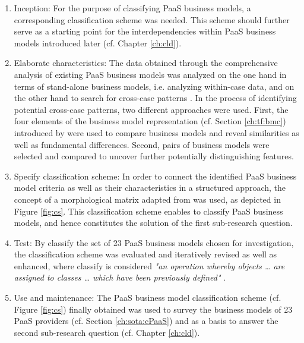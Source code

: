 \begin{enumerate}
	\item Inception: For the purpose of classifying \ac{PaaS} business models, a corresponding classification scheme was needed. This scheme should further serve as a starting point for the interdependencies within \ac{PaaS} business models introduced later (cf. Chapter \ref{ch:cld}).

	\item Elaborate characteristics: The data obtained through the comprehensive analysis of existing \ac{PaaS} business models was analyzed on the one hand in terms of stand-alone business models, i.e. analyzing within-case data, and on the other hand to search for cross-case patterns \citep[pp. 539-540]{Eisenhardt1989}. In the process of identifying potential cross-case patterns, two different approaches were used. First, the four elements of the business model representation (cf. Section \ref{ch:tf:bmc}) introduced by \citet{Johnson2008} were used to compare business models and reveal similarities as well as fundamental differences. Second, pairs of business models were selected and compared to uncover further potentially distinguishing features. 

	\item Specify classification scheme: In order to connect the identified \ac{PaaS} business model criteria as well as their characteristics in a structured approach, the concept of a morphological matrix adapted from \citet{ Zwicky1969} was used, as depicted in Figure \ref{fig:cs}. This classification scheme enables to classify \ac{PaaS} business models, and hence constitutes the solution of the first sub-research question.

	\item Test: By classify the set of 23 \ac{PaaS} business models chosen for investigation, the classification scheme was evaluated and iteratively revised as well as enhanced, where classify is considered \textit{"an operation whereby objects \ldots\xspace are assigned to classes \ldots\xspace which have been previously defined"} \citep[p. 130]{Marradi1990}.

	\item Use and maintenance: The \ac{PaaS} business model classification scheme (cf. Figure \ref{fig:cs}) finally obtained was used to survey the business models of 23 \ac{PaaS} providers (cf. Section \ref{ch:sota:cPaaS}) and as a basis to answer the second sub-research question (cf. Chapter \ref{ch:cld}).
\end{enumerate}

